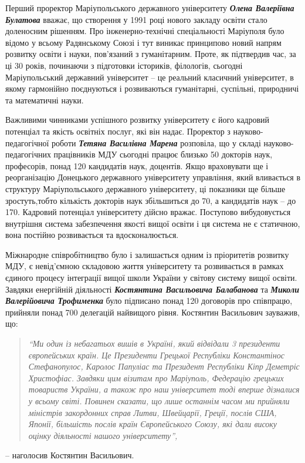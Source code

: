 Перший проректор Маріупольського державного університету \emph{\textbf{Олена Валеріївна
Булатова}} вважає, що створення у 1991 році нового закладу освіти стало
доленосним рішенням. Про інженерно-технічні спеціальності Маріуполя було відомо
у всьому Радянському Союзі і тут виникає принципово новий напрям розвитку
освіти і науки, пов’язаний з гуманітарним. Проте, як підтвердив час, за ці 30
років, починаючи з підготовки істориків, філологів, сьогодні Маріупольський
державний університет – це реальний класичний університет, в якому гармонійно
поєднуються і розвиваються гуманітарні, суспільні, природничі та математичні
науки.


Важливими чинниками успішного розвитку університету є його кадровий потенціал
та якість освітніх послуг, які він надає. Проректор з науково-педагогічної
роботи \emph{\textbf{Тетяна Василівна Марена}} розповіла, що у складі науково-педагогічних
працівників МДУ сьогодні працює близько 50 докторів наук, професорів, понад 120
кандидатів наук, доцентів. Якщо враховувати ще і реорганізацію Донецького
державного університету управління, який вливається в структуру Маріупольського
державного університету, ці показники ще більше зростуть,тобто кількість
докторів наук збільшиться до 70, а кандидатів наук – до 170. Кадровий потенціал
університету дійсно вражає. Поступово вибудовується внутрішня система
забезпечення якості вищої освіти і ця система не є статичною, вона постійно
розвивається та вдосконалюється.


Міжнародне співробітництво було і залишається одним із пріоритетів розвитку
МДУ, є невід'ємною складовою життя університету та розвивається в рамках
єдиного процесу інтеграції вищої школи України у світову систему вищої освіти.
Завдяки енергійній діяльності \emph{\textbf{Костянтина Васильовича Балабанова}} та \emph{\textbf{Миколи
Валерійовича Трофименка}} було підписано понад 120 договорів про співпрацю,
прийняли понад 700 делегацій найвищого рівня. Костянтин Васильович зауважив,
що:  

\begin{quote}
\em\enquote{Ми один із небагатьох вишів в Україні, який відвідали 3 президенти
європейських країн. Це Президенти Грецької Республіки Константінос
Стефанопулос, Каролос Папуліас та Президент Республіки Кіпр Деметріс
Христофіас. Завдяки цим візитам про Маріуполь, Федерацію грецьких товариств
України, а також про наш університет тоді вперше дізналися у всьому світі.
Повинен сказати, що лише останнім часом ми прийняли міністрів закордонних справ
Литви, Швейцарії, Греції, послів США, Японії, більшість послів країн
Європейського Союзу, які дали високу оцінку діяльності нашого університету}, 
\end{quote}
– наголосив Костянтин Васильович.

